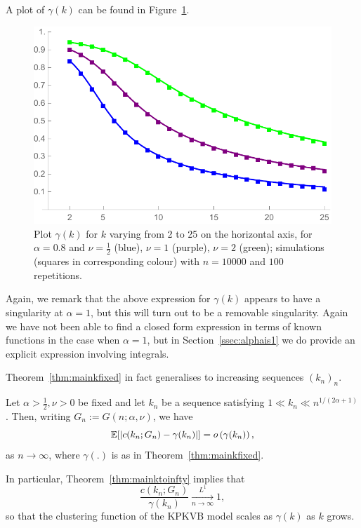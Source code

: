 \noindent
A plot of $\gamma(k)$ can be found in Figure~\ref{fig:gammak}. %
%
%
\begin{figure}[h!]
    \centering
    \includegraphics[scale=0.6]{figures/ckn10000a08nu0512rep100k2to25Squares.pdf}
    \caption{Plot $\gamma(k)$ for $k$ varying from 2 to 25 on the horizontal axis, for $\alpha=0.8$ and $\nu=\frac{1}{2}$ 
    (blue), $\nu=1$ (purple), $\nu=2$ (green); simulations (squares in corresponding colour) with $n=10000$ and $100$ repetitions.\label{fig:gammak}}
\end{figure}%
%
Again, we remark that the above expression for $\gamma(k)$ appears to have a singularity at $\alpha=1$, but this will turn out to be a
removable singularity. Again we have not been able to find a closed form expression in terms of known functions in the case when $\alpha=1$, but
in Section~\ref{ssec:alphais1} we do provide an explicit expression involving integrals.

Theorem~\ref{thm:mainkfixed} in fact generalises to increasing sequences $(k_n)_n$.

\begin{theorem}\label{thm:mainktoinfty}
Let $\alpha>\frac12, \nu>0$ be fixed and let $k_n$ be a sequence 
satisfying $1 \ll k_n \ll n^{1/(2\alpha+1)}$. Then, writing $G_n := G(n;\alpha,\nu)$, we have
\[
	\mathbb{E}[|c(k_n;G_n)-\gamma(k_n)|] = o\left(\gamma(k_n)\right),
\]
as $n \to \infty$, where $\gamma(.)$ is as in Theorem~\ref{thm:mainkfixed}.
\end{theorem}

In particular, Theorem~\ref{thm:mainktoinfty} implies that
\[
	\frac{c(k_n; G_n)}{\gamma(k_n)} \xrightarrow[n\to\infty]{L^1} 1,
\]
so that the clustering function of the KPKVB model scales as $\gamma(k)$ as $k$ grows.

